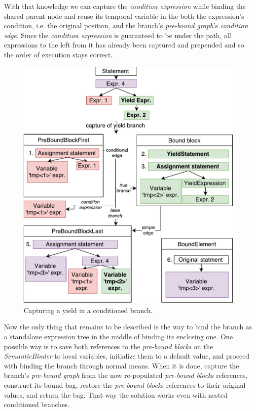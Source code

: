 With that knowledge we can capture the \emph{condition expression} while binding the shared parent node and reuse its temporal variable in the both the expression’s condition, i.e. the original position, and the branch’s \emph{pre-bound graph}’s \emph{condition edge}. Since the \emph{condition expression} is guaranteed to be under the path, all expressions to the left from it has already been captured and prepended and so the order of execution stays correct.

\begin{figure}[H]
	\centering	
	\includegraphics[scale=0.75]{../img/5_3_yieldInCond}	
	\caption{Capturing a yield in a conditioned branch.}
	\label{fig5.3:YieldInCond}
\end{figure}

Now the only thing that remains to be described is the way to bind the branch as a standalone expression tree in the middle of binding its enclosing one. One possible way is to save both references to the \emph{pre-bound blocks} on the \emph{SemanticBinder} to local variables, initialize them to a default value, and proceed with binding the branch through normal means. When it is done, capture the branch’s \emph{pre-bound graph} from the now re-populated \emph{pre-bound block}s references, construct its bound bag, restore the \emph{pre-bound block}s references to their original values, and return the bag. That way the solution works even with nested conditioned branches.

